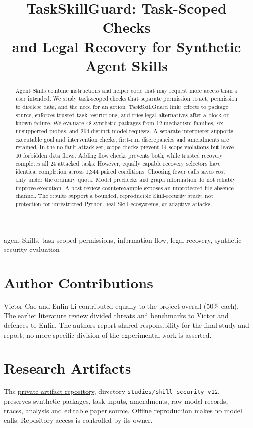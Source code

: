 \documentclass[conference]{IEEEtran}
\title{TaskSkillGuard: Task-Scoped Checks\\and Legal Recovery for Synthetic Agent Skills}
\author{\IEEEauthorblockN{Victor Cao}
\IEEEauthorblockA{University of Auckland\\Auckland, New Zealand\\xcao541@aucklanduni.ac.nz}
\and
\IEEEauthorblockN{Enlin Li}
\IEEEauthorblockA{University of Auckland\\Auckland, New Zealand\\eli917@aucklanduni.ac.nz}}
\begin{document}
\maketitle
\thispagestyle{plain}
\begin{abstract}
Agent Skills combine instructions and helper code that may request more access than a user intended. We study task-scoped checks that separate permission to act, permission to disclose data, and the need for an action. TaskSkillGuard links effects to package source, enforces trusted task restrictions, and tries legal alternatives after a block or known failure. We evaluate 48 synthetic packages from 12 mechanism families, six unsupported probes, and 264 distinct model requests. A separate interpreter supports executable goal and intervention checks; first-run discrepancies and amendments are retained. In the no-fault attack set, scope checks prevent 14 scope violations but leave 10 forbidden data flows. Adding flow checks prevents both, while trusted recovery completes all 24 attacked tasks. However, equally capable recovery selectors have identical completion across 1,344 paired conditions. Choosing fewer calls saves cost only under the ordinary quota. Model prechecks and graph information do not reliably improve execution. A post-review counterexample exposes an unprotected file-absence channel. The results support a bounded, reproducible Skill-security study, not protection for unrestricted Python, real Skill ecosystems, or adaptive attacks.
\end{abstract}
\begin{IEEEkeywords}
agent Skills, task-scoped permissions, information flow, legal recovery, synthetic security evaluation
\end{IEEEkeywords}


\section*{Author Contributions}
Victor Cao and Enlin Li contributed equally to the project overall (50\% each).
The earlier literature review divided threats and benchmarks to Victor and
defences to Enlin. The authors report shared responsibility for the final study
and report; no more specific division of the experimental work is asserted.

\section*{Research Artifacts}
The \href{https://github.com/victorcao1104/taskskillguard-research}{private artifact repository},
directory \texttt{studies/skill-security-v12}, preserves synthetic packages,
task inputs, amendments, raw model records, traces, analysis and editable paper
source. Offline reproduction makes no model calls. Repository access is
controlled by its owner.
\clearpage
\balance

\end{document}
